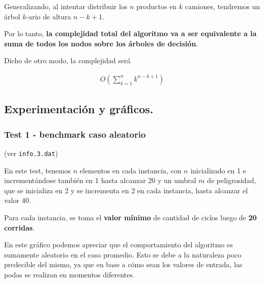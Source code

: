 Generalizando, al intentar distribuir los $n$ productos en $k$
camiones, tendremos un árbol $k$-ario de altura $n - k + 1$.

Por lo tanto, \textbf{la complejidad total del algoritmo va a ser equivalente a la
suma de todos los nodos sobre los árboles de decisión}.

Dicho de otro modo, la complejidad será

\begin{align*}
  O(\sum_{k=1}^n k^{n - k + 1})
\end{align*}

\vspace*{0.75cm} \noindent


\newpage
\subsection{Experimentación y gráficos.}

\vspace*{0.3cm}

\subsubsection{Test 1 - benchmark caso aleatorio}

(ver \verb|info.3.dat|) \medskip

En este test, tenemos $n$ elementos en cada instancia, con $n$ inicializado en 1 e incrementándose
también en 1 hasta alcanzar 20 y un umbral $m$ de peligrosidad, que se inicializa en 2 y se incrementa
en 2 en cada instancia, hasta alcanzar el valor 40.

Para cada instancia, se toma el \textbf{valor mínimo} de cantidad de ciclos luego de \textbf{20 corridas}.

\vspace*{0.5cm}


\vspace*{0.5cm}

En este gráfico podemos apreciar que el comportamiento del algoritmo es
sumamente aleatorio en el caso promedio. Esto se debe a la naturaleza poco
predecible del mismo, ya que en base a cómo sean los valores de entrada, las
podas se realizan en momentos diferentes.


